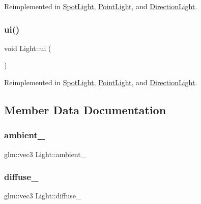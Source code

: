 Reimplemented in \hyperlink{classSpotLight_a4599dbd0a665514ff7066bfa01d04d1e}{Spot\+Light}, \hyperlink{classPointLight_abf6f298a0d04b636e22a3a5903e5b823}{Point\+Light}, and \hyperlink{classDirectionLight_ab10f7b680a8245bd4db3b7340593e485}{Direction\+Light}.

\mbox{\label{classLight_a15770d3a4b173cd517477dfb5d5bcab9}} 
\subsubsection{\texorpdfstring{ui()}{ui()}}
{\footnotesize\ttfamily void Light\+::ui (\begin{DoxyParamCaption}{ }\end{DoxyParamCaption})\hspace{0.3cm}{\ttfamily [virtual]}}



Reimplemented in \hyperlink{classSpotLight_a7ca46a2356ceb4f193704632e1f17bb4}{Spot\+Light}, \hyperlink{classPointLight_a538a42e0d1d713c57e46e492d352b34e}{Point\+Light}, and \hyperlink{classDirectionLight_a85ac86467a3053dea596b0ebf362b68f}{Direction\+Light}.



\subsection{Member Data Documentation}
\mbox{\label{classLight_ad255e60575bdb0ca5e9e63b738877327}} 
\subsubsection{\texorpdfstring{ambient\+\_\+}{ambient\_}}
{\footnotesize\ttfamily glm\+::vec3 Light\+::ambient\+\_\+}

\mbox{\label{classLight_ac5934c40340eb38365a9c090473c884f}} 
\subsubsection{\texorpdfstring{diffuse\+\_\+}{diffuse\_}}
{\footnotesize\ttfamily glm\+::vec3 Light\+::diffuse\+\_\+}


